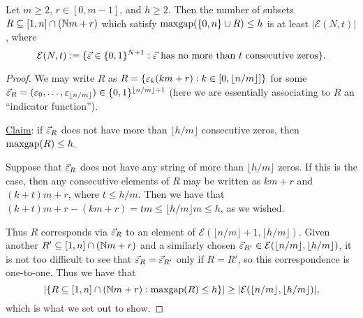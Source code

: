 





\begin{lemma} \label{lem:concentration to tuples}
Let $m\ge 2$, $r\in [0,m-1]$, and $h\ge 2$.
Then the number of subsets $R\subseteq [1,n]\cap (\mathbb{N} m +r)$ which satisfy $\operatorname{maxgap}(\{0,n\}\cup R) \le h$ is at least $|\mathcal{E}(N,t)|$, where
\[ \mathcal{E}(N,t) := \{ \vec{\varepsilon}\in \{0,1\}^{N+1}: \vec{\varepsilon} \textrm{ has no more than $t$ consecutive zeros}\}. \]
\end{lemma}
\begin{proof}
We may write $R$ as $R = \{ \varepsilon_k(km+r): k\in [0,\lfloor n/m \rfloor] \}$ for some $\vec{\varepsilon}_R = (\varepsilon_0,\dots,\varepsilon_{\lfloor n/m \rfloor}) \in \{0,1\}^{\lfloor n/m \rfloor+1}$ (here we are essentially associating to $R$ an ``indicator function'').

\underline{Claim}: if $\vec{\varepsilon}_R$ does not have more than $\lfloor h/m \rfloor$ consecutive zeros, then $\operatorname{maxgap}(R) \le h$.

Suppose that $\vec{\varepsilon}_R$ does not have any string of more than $\lfloor h/m \rfloor$ zeros.
If this is the case, then any consecutive elements of $R$ may be written as $km+r$ and $(k+t)m+r$, where $t\le h/m$.
Then we have that $(k+t)m+r - (km+r) = tm \le \lfloor h/m \rfloor m \le h$, as we wished.

Thus $R$ corresponds via $\vec{\varepsilon}_R$ to an element of $\mathcal{E}(\lfloor n/m \rfloor+1,\lfloor h/m \rfloor)$.
Given another $R'\subseteq [1,n]\cap (\mathbb{N} m+ r)$ and a similarly chosen $\vec{\varepsilon}_{R'}\in \mathcal{E}(\lfloor n/m \rfloor,\lfloor h/m \rfloor)$, it is not too difficult to see that $\vec{\varepsilon}_R = \vec{\varepsilon}_{R'}$ only if $R=R'$, so this correspondence is one-to-one.
Thus we have that 
\[ |\{ R\subseteq [1,n]\cap (\mathbb{N} m + r): \operatorname{maxgap}(R)\le h\}| 
\ge |\mathcal{E}(\lfloor n/m \rfloor, \lfloor h/m \rfloor)|, \]
which is what we set out to show.
\end{proof}

